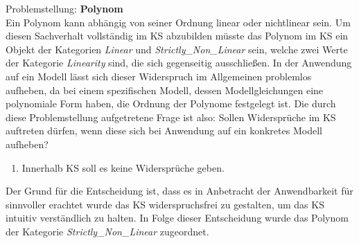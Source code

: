 Problemstellung: \textbf{Polynom}\\
Ein Polynom kann abhängig von seiner Ordnung linear oder nichtlinear sein. Um diesen Sachverhalt vollständig im KS abzubilden müsste das Polynom im KS ein Objekt der Kategorien \textit{Linear} und \textit{Strictly\_Non\_Linear} sein, welche zwei Werte der Kategorie \textit{Linearity} sind, die sich gegenseitig ausschließen. In der Anwendung auf ein Modell lässt sich dieser Widerspruch im Allgemeinen problemlos aufheben, da bei einem spezifischen Modell, dessen Modellgleichungen eine polynomiale Form haben, die Ordnung der Polynome festgelegt ist. Die durch diese Problemstellung aufgetretene Frage ist also: Sollen Widersprüche im KS auftreten dürfen, wenn diese sich bei Anwendung auf ein konkretes Modell aufheben?
\begin{enumerate}[resume*]
	\item \label{E.KS_Widersprüche}Innerhalb KS soll es keine Widersprüche geben.
\end{enumerate}
Der Grund für die Entscheidung ist, dass es in Anbetracht der Anwendbarkeit für sinnvoller erachtet wurde das KS widerspruchsfrei zu gestalten, um das KS intuitiv verständlich zu halten. In Folge dieser Entscheidung wurde das Polynom der Kategorie \textit{Strictly\_Non\_Linear} zugeordnet.












